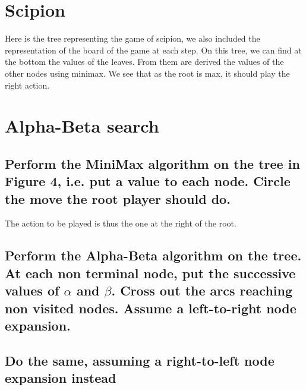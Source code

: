 \documentclass[a4paper,10pt]{article}
\begin{document}
	
\newpage
	
	
	

	\section{Scipion}
		Here is the tree representing the game of scipion, we also included the representation of the board of the game at each step.
		On this tree, we can find at the bottom the values of the leaves. From them are derived the values of the other nodes using minimax. We see that as the root is max, it should play the right action.
	\section{Alpha-Beta search}	
		\subsection{Perform the MiniMax algorithm on the tree in Figure 4, i.e. put a value to each node. Circle the move the root player should do.}
		The action to be played is thus the one at the right of the root.
		\subsection{Perform the Alpha-Beta algorithm on the tree. At each non terminal node, put the successive values of $\alpha$ and $\beta$. Cross out the arcs reaching non visited nodes. Assume a left-to-right node expansion.}		
		\subsection{Do the same, assuming a right-to-left node expansion instead}
\end{document}
